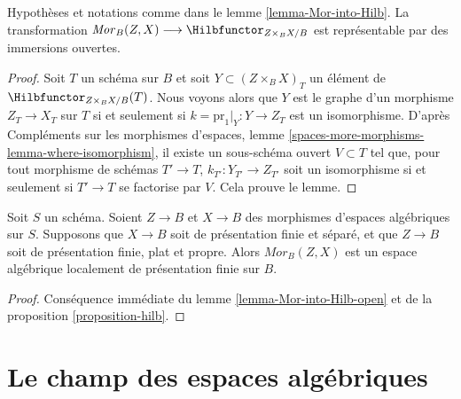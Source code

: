 \begin{lemma}
\label{lemma-Mor-into-Hilb-open}
Hypothèses et notations comme dans le lemme \ref{lemma-Mor-into-Hilb}.
La transformation
$\mathit{Mor}_B(Z, X) \longrightarrow \Hilbfunctor_{Z \times_B X/B}$
est représentable par des immersions ouvertes.
\end{lemma}

\begin{proof}
Soit $T$ un schéma sur $B$ et soit $Y \subset (Z \times_B X)_T$
un élément de $\Hilbfunctor_{Z \times_B X/B}(T)$. Nous voyons alors que
$Y$ est le graphe d'un morphisme $Z_T \to X_T$ sur $T$ si et seulement si
$k = \text{pr}_1|_Y : Y \to Z_T$ est un isomorphisme. D'après
Compléments sur les morphismes d'espaces, lemme
\ref{spaces-more-morphisms-lemma-where-isomorphism}, il existe un sous-schéma
ouvert $V \subset T$ tel que, pour tout morphisme de schémas $T' \to T$,
$k_{T'} : Y_{T'} \to Z_{T'}$ soit un isomorphisme si et seulement si
$T' \to T$ se factorise par $V$.
Cela prouve le lemme.
\end{proof}

\begin{proposition}
\label{proposition-Mor}
Soit $S$ un schéma. Soient $Z \to B$ et $X \to B$ des morphismes d'espaces
algébriques sur $S$. Supposons que $X \to B$ soit de présentation finie et
séparé, et que $Z \to B$ soit de présentation finie, plat et propre. Alors
$\mathit{Mor}_B(Z, X)$ est un espace algébrique localement de présentation
finie sur $B$.
\end{proposition}

\begin{proof}
Conséquence immédiate du lemme \ref{lemma-Mor-into-Hilb-open}
et de la proposition \ref{proposition-hilb}.
\end{proof}







\section{Le champ des espaces algébriques}
\label{section-stack-of-spaces}

